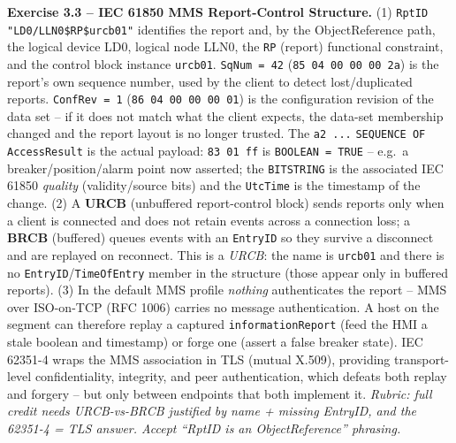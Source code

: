 \documentclass[11pt,a4paper]{article}
\begin{document}
\begin{solutionbox}
\textbf{Exercise 3.3 -- IEC 61850 MMS Report-Control Structure.}
(1) \texttt{RptID} \texttt{"LD0/LLN0\$RP\$urcb01"} identifies the report and,
by the ObjectReference path, the logical device LD0, logical node LLN0, the
\texttt{RP} (report) functional constraint, and the control block instance
\texttt{urcb01}. \texttt{SqNum = 42} (\texttt{85 04 00 00 00 2a}) is the
report's own sequence number, used by the client to detect lost/duplicated
reports. \texttt{ConfRev = 1} (\texttt{86 04 00 00 00 01}) is the
configuration revision of the data set -- if it does not match what the
client expects, the data-set membership changed and the report layout is no
longer trusted. The \texttt{a2 ...} \texttt{SEQUENCE OF AccessResult} is the
actual payload: \texttt{83 01 ff} is \texttt{BOOLEAN = TRUE} -- e.g.\ a
breaker/position/alarm point now asserted; the \texttt{BITSTRING} is the
associated IEC 61850 \emph{quality} (validity/source bits) and the
\texttt{UtcTime} is the timestamp of the change.
(2) A \textbf{URCB} (unbuffered report-control block) sends reports only when
a client is connected and does not retain events across a connection loss; a
\textbf{BRCB} (buffered) queues events with an \texttt{EntryID} so they
survive a disconnect and are replayed on reconnect. This is a \emph{URCB}:
the name is \texttt{urcb01} and there is no \texttt{EntryID}/\texttt{TimeOfEntry}
member in the structure (those appear only in buffered reports).
(3) In the default MMS profile \emph{nothing} authenticates the report --
MMS over ISO-on-TCP (RFC 1006) carries no message authentication. A host on
the segment can therefore replay a captured \texttt{informationReport} (feed
the HMI a stale boolean and timestamp) or forge one (assert a false breaker
state). IEC 62351-4 wraps the MMS association in TLS (mutual X.509),
providing transport-level confidentiality, integrity, and peer
authentication, which defeats both replay and forgery -- but only between
endpoints that both implement it.
\textit{Rubric: full credit needs URCB-vs-BRCB justified by name + missing
EntryID, and the 62351-4 = TLS answer. Accept ``RptID is an
ObjectReference'' phrasing.}
\end{solutionbox}
\end{document}
